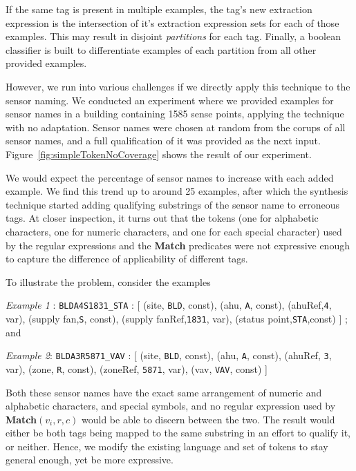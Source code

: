 If the same tag is present in multiple examples, the tag's new extraction expression is the intersection of it's extraction expression sets for each of those examples. This may result in disjoint {\it partitions} for each tag. Finally, a boolean classifier is built to differentiate examples of each partition from all other provided examples. 

However, we run into various challenges if we directly apply this technique to the sensor naming. We conducted an experiment where we provided examples for sensor names in a building containing 1585 sense points, applying the technique with no adaptation. Sensor names were chosen at random from the corups of all sensor names, and a full qualification of it was provided as the next input. Figure~\ref{fig:simpleTokenNoCoverage} shows the result of our experiment.

We would expect the percentage of sensor names to increase with each added example. We find this trend up to around 25 examples, after which the synthesis technique started adding qualifying substrings of the sensor name to erroneous tags. At closer inspection, it turns out that the tokens  (one for alphabetic characters, one for numeric characters, and one for each special character) used by the regular expressions and the {\bf Match} predicates were not expressive enough to capture the difference of applicability of different tags. 

To illustrate the problem, consider the examples 

{\it Example 1} : \texttt{BLDA4S1831\_STA} : [ (site, \texttt{BLD}, const), (ahu, \texttt{A}, const), (ahuRef,\texttt{4}, var), (supply fan,\texttt{S}, const), (supply fanRef,\texttt{1831}, var), (status point,\texttt{STA},const) ] ; and 

{\it Example 2}: \texttt{BLDA3R5871\_VAV} : [ (site, \texttt{BLD}, const), (ahu, \texttt{A}, const), (ahuRef, \texttt{3}, var), (zone, \texttt{R}, const), (zoneRef, \texttt{5871}, var), (vav, \texttt{VAV}, const) ]

Both these sensor names have the exact same arrangement of numeric and alphabetic characters, and special symbols, and no regular expression used by {\bf Match}$(v_i,r,c)$  would be able to discern between the two. The result would either be both tags being mapped to the same substring in an effort to qualify it, or neither. Hence, we modify the existing language and set of tokens to stay general enough, yet be more expressive.

